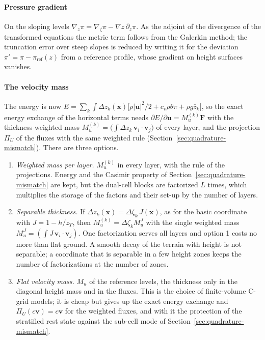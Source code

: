 \documentclass[preprint,12pt]{elsarticle}
\newcommand{\bu}{\mathbf{u}}
\newcommand{\bv}{\mathbf{v}}
\newcommand{\bF}{\mathbf{F}}
\theoremstyle{definition}
\begin{document}
\paragraph{Pressure gradient} On the sloping levels $\nabla_z\pi = \nabla_\zeta\pi - \nabla z\,\partial_z\pi$. As the
adjoint of the divergence of the transformed equations the metric term follows from the Galerkin method; the
truncation error over steep slopes is reduced by writing it for the deviation $\pi' = \pi - \pi_\mathrm{ref}(z)$
from a reference profile, whose gradient on height surfaces vanishes.

\paragraph{The velocity mass} The energy is now
$E = \sum_k\int\Delta z_k(\mathbf{x})\bigl[\rho|\bu|^2/2 + c_v\rho\theta\pi + \rho g\bar z_k\bigr]$, so the exact energy
exchange of the horizontal terms needs $\partial E/\partial\bu = M_u^{(k)}\bF$ with the thickness-weighted mass
$M_u^{(k)} = \bigl(\int\Delta z_k\,\bv_i\cdot\bv_j\bigr)$ of every layer, and the projection $\Pi_U$ of the fluxes
with the same weighted rule (Section~\ref{sec:quadrature-mismatch}). There are three options.
\begin{enumerate}
\item \emph{Weighted mass per layer.} $M_u^{(k)}$ in every layer, with the rule of the projections. Energy and
  the Casimir property of Section~\ref{sec:quadrature-mismatch} are kept, but the dual-cell blocks are
  factorized $L$ times, which multiplies the storage of the factors and their set-up by the number of layers.
\item \emph{Separable thickness.} If $\Delta z_k(\mathbf{x}) = \Delta\zeta_k\,J(\mathbf{x})$, as for the basic coordinate with
  $J = 1 - h/z_T$, then $M_u^{(k)} = \Delta\zeta_k M_u^J$ with the single weighted mass
  $M_u^J = (\int J\,\bv_i\cdot\bv_j)$. One factorization serves all layers and option 1 costs no more than flat
  ground. A smooth decay of the terrain with height is not separable; a coordinate that is separable in a
  few height zones keeps the number of factorizations at the number of zones.
\item \emph{Flat velocity mass.} $M_u$ of the reference levels, the thickness only in the diagonal height mass and
  in the fluxes. This is the choice of finite-volume C-grid models; it is cheap but gives up the exact energy
  exchange and $\Pi_U(c\bv) = c\bv$ for the weighted fluxes, and with it the protection of the stratified rest
  state against the sub-cell mode of Section~\ref{sec:quadrature-mismatch}.
\end{enumerate}
\end{document}
